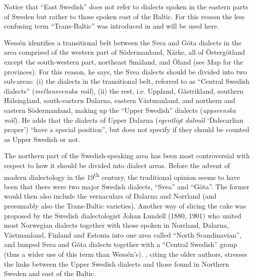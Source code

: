 \begin{styleBodyTextFirst}
Notice that “East Swedish” does not refer to dialects spoken in the eastern parts of Sweden but rather to those spoken east of the Baltic. For this reason the less confusing term “Trans-Baltic” was introduced in \citet{Rendahl2001} and will be used here.

\end{styleBodyTextFirst}

\begin{styleBodytextC}
Wessén identifies a transitional belt between the Svea and Göta dialects in the area comprised of the western part of Södermanland, Närke, all of Östergötland except the south-western part, northeast Småland, and Öland (see Map  for the provinces). For this reason, he says, the Svea dialects should be divided into two sub-areas: (i) the dialects in the transitional belt, referred to as “Central Swedish dialects” (\textit{mellansvenska mål}), (ii) the rest, i.e. Uppland, Gästrikland, southern Hälsingland, south-eastern Dalarna, eastern Västmanland, and northern and eastern Södermanland, making up the “Upper Swedish” dialects (\textit{uppsvenska mål}). He adds that the dialects of Upper Dalarna (\textit{egentligt dalmål} ‘Dalecarlian proper’) \label{bkm:wessenquote}“have a special position”, but does not specify if they should be counted as Upper Swedish or not.

\end{styleBodytextC}

\begin{styleBodytextC}
The northern part of the Swedish-speaking area has been most controversial with respect to how it should be divided into dialect areas. Before the advent of modern dialectology in the 19\textsuperscript{th} century, the traditional opinion seems to have been that there were two major Swedish dialects, “Svea” and “Göta”. The former would then also include the vernaculars of Dalarna and Norrland (and presumably also the Trans-Baltic varieties). Another way of slicing the cake was proposed by the Swedish dialectologist Johan Lundell (1880, 1901)  who united most Norwegian dialects together with those spoken in Norrland, Dalarna, Västmanland, Finland and Estonia into one area called “North Scandinavian”, and lumped Svea and Göta dialects together with a “Central Swedish” group (thus a wider use of this term than Wessén’s). \citet{Hesselman1905}, citing the older authors, stresses the links between the Upper Swedish dialects and those found in Northern Sweden and east of the Baltic. 

\end{styleBodytextC}


